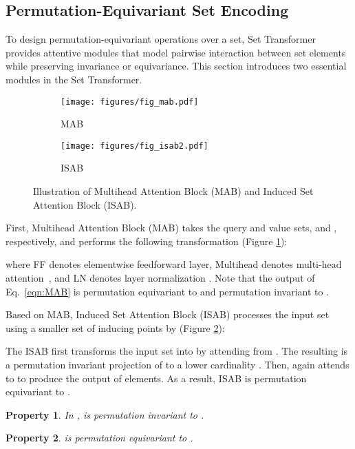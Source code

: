 \documentclass[final]{arxiv/cvpr}
\newtheorem{property}{Property}
\begin{document}
\subsection{Permutation-Equivariant Set Encoding}
\label{sec:settransformer}
To design permutation-equivariant operations over a set, Set Transformer~\cite{lee2019set} provides attentive modules that model pairwise interaction between set elements while preserving invariance or equivariance.
This section introduces two essential modules in the Set Transformer. 
\begin{figure}[t!]
    \centering
    \begin{subfigure}[b]{0.23\textwidth}
        \centering
        \texttt{[image: figures/fig\_mab.pdf]}
\caption{MAB}
        \label{fig:mab}
    \end{subfigure}
    \hfill
    \begin{subfigure}[b]{0.23\textwidth}
        \centering
        \texttt{[image: figures/fig\_isab2.pdf]}
        \caption{ISAB}
\label{fig:isab}
    \end{subfigure}
    \vspace{-0.1in}
    \caption{Illustration of Multihead Attention Block (MAB) and Induced Set Attention Block (ISAB).}
\label{fig:st}
\vspace{-0.55cm}
\end{figure}

First, Multihead Attention Block (MAB) takes the query and value sets,  and  , respectively, and performs the following transformation (Figure \ref{fig:mab}):

where FF denotes elementwise feedforward layer, Multihead denotes multi-head attention~\cite{vaswani2017attention}, and LN denotes layer normalization \cite{lee2019set}.
Note that the output of Eq.~\eqref{eqn:MAB} is permutation equivariant to  and permutation invariant to .

Based on MAB, Induced Set Attention Block (ISAB) processes the input set  using a 
smaller set of inducing points  by (Figure \ref{fig:isab}):

The ISAB first transforms the input set  into  by attending from .
The resulting  is a permutation invariant projection of  to a lower cardinality .
Then,  again attends to  to produce the output of  elements.
As a result, ISAB is permutation equivariant to .

\begin{property}
In ,  is permutation invariant to .
\end{property}
\begin{property}
\vspace{-0.2cm}
 is permutation equivariant to .
\end{property}
\end{document}
